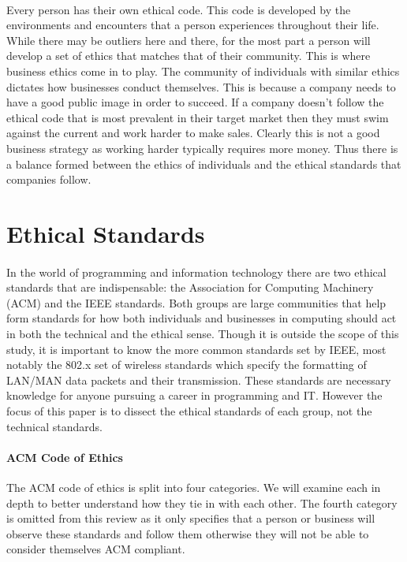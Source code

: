 \documentclass[notitlepage,a4paper,12pt]{article}
\begin{document}
\paragraph{}Every person has their own ethical code. This code is developed by the environments and encounters that a person experiences throughout their life. While there may be outliers here and there, for the most part a person will develop a set of ethics that matches that of their community. This is where business ethics come in to play. The community of individuals with similar ethics dictates how businesses conduct themselves. This is because a company needs to have a good public image in order to succeed. If a company doesn't follow the ethical code that is most prevalent in their target market then they must swim against the current and work harder to make sales. Clearly this is not a good business strategy as working harder typically requires more money. Thus there is a balance formed between the ethics of individuals and the ethical standards that companies follow.

\section*{Ethical Standards}
\paragraph{}In the world of programming and information technology there are two ethical standards that are indispensable: the Association for Computing Machinery (ACM) and the IEEE standards. Both groups are large communities that help form standards for how both individuals and businesses in computing should act in both the technical and the ethical sense. Though it is outside the scope of this study, it is important to know the more common standards set by IEEE, most notably the 802.x set of wireless standards which specify the formatting of LAN/MAN data packets and their transmission. These standards are necessary knowledge for anyone pursuing a career in programming and IT. However the focus of this paper is to dissect the ethical standards of each group, not the technical standards.
\paragraph{ACM Code of Ethics}The ACM code of ethics is split into four categories. We will examine each in depth to better understand how they tie in with each other. The fourth category is omitted from this review as it only specifies that a person or business will observe these standards and follow them otherwise they will not be able to consider themselves ACM compliant.
\end{document}
